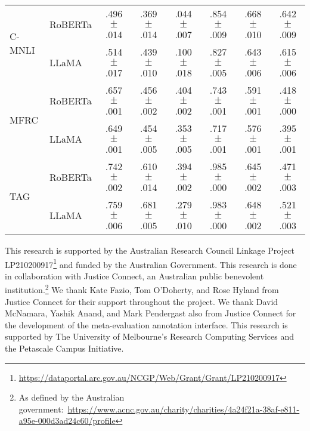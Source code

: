 \documentclass[shortpaper]{clv2025}
\begin{document}
\begin{table}[!h]
\begin{tabular}{@{}ll*{6}{c}@{}}
  \multirow[c]{2}{*}{C-MNLI}    & RoBERTa    & .496 $\pm$ .014          & .369 $\pm$ .014          & .044 $\pm$ .007 & .854 $\pm$ .009 & .668 $\pm$ .010               & .642 $\pm$ .009               \\
                                & LLaMA      & .514 $\pm$ .017          & .439 $\pm$ .010          & .100 $\pm$ .018 & .827 $\pm$ .005 & .643 $\pm$ .006               & .615 $\pm$ .006               \\
  \cmidrule{1-8}
  \multirow[c]{2}{*}{MFRC}      & RoBERTa    & .657 $\pm$ .001          & .456 $\pm$ .002          & .404 $\pm$ .002 & .743 $\pm$ .001 & .591 $\pm$ .001               & .418 $\pm$ .000               \\
                                & LLaMA      & .649 $\pm$ .001          & .454 $\pm$ .005          & .353 $\pm$ .005 & .717 $\pm$ .001 & .576 $\pm$ .001               & .395 $\pm$ .001               \\
  \cmidrule{1-8}
  \multirow[c]{2}{*}{TAG}       & RoBERTa    & .742 $\pm$ .002          & .610 $\pm$ .014          & .394 $\pm$ .002 & .985 $\pm$ .000 & .645 $\pm$ .002               & .471 $\pm$ .003               \\
                                & LLaMA      & .759 $\pm$ .006          & .681 $\pm$ .005          & .279 $\pm$ .010 & .983 $\pm$ .000 & .648 $\pm$ .002               & .521 $\pm$ .003               \\
  \bottomrule
  \end{tabular}
\end{table}

\begin{acknowledgments}
This research is supported by the Australian Research Council Linkage Project
LP210200917\footnote{\url{https://dataportal.arc.gov.au/NCGP/Web/Grant/Grant/LP210200917}}
and funded by the Australian Government. This research is done in collaboration
with Justice Connect, an Australian public benevolent institution.\footnote{As
  defined by the Australian
  government:~\url{https://www.acnc.gov.au/charity/charities/4a24f21a-38af-e811-a95e-000d3ad24c60/profile}}
We thank Kate Fazio, Tom O'Doherty, and Rose Hyland from Justice Connect for
their support throughout the project. We thank David McNamara, Yashik Anand, and
Mark Pendergast also from Justice Connect for the development of the
meta-evaluation annotation interface. This research is supported by The
University of Melbourne’s Research Computing Services and the Petascale Campus
Initiative.
\end{acknowledgments}



\end{document}
